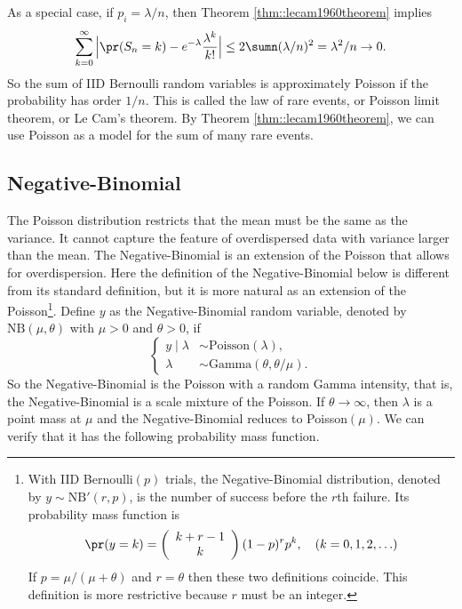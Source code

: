 As a special case, if $p_i = \lambda /  n$, then Theorem \ref{thm::lecam1960theorem} implies 
$$
\sum_{k=0}^{\infty}  \Big |   \pr(S_n = k) - e^{-\lambda} \frac{ \lambda^k }{ k!}  \Big | \leq 2\sumn (\lambda /  n)^2 = \lambda^2/n \rightarrow 0.
$$
So the sum of IID Bernoulli random variables is approximately Poisson if the probability has order $1/n.$ This is called the law of rare events, or Poisson limit theorem, or Le Cam's theorem. By Theorem \ref{thm::lecam1960theorem}, we can use Poisson as a model for the sum of many rare events. 



\subsection{Negative-Binomial}

The Poisson distribution restricts that the mean must be the same
as the variance. It cannot capture the feature of overdispersed data
with variance larger than the mean. The Negative-Binomial is an extension
of the Poisson that allows for overdispersion. Here the definition of the Negative-Binomial below is different from its standard definition, but it is more natural as an extension of the Poisson\footnote{With IID Bernoulli$(p)$ trials, the Negative-Binomial distribution,
denoted by $y\sim\text{NB}'(r,p)$, is the number of success before
the $r$th failure. 
Its probability mass function is
\[
\pr(y=k)=\left(\begin{array}{c}
k+r-1\\
k
\end{array}\right)(1-p)^{r}p^{k},\quad(k=0,1,2,\ldots)
\]
If $p=\mu/(\mu+\theta)$ and $r=\theta$ then these two definitions
coincide. 
This definition is more restrictive because $r$ must
be an integer. }. Define $y$ as the Negative-Binomial random
variable, denoted by $\text{NB}(\mu,\theta)$ with $\mu>0$ and $\theta>0$,
if 
\begin{equation}
\begin{cases}
y\mid\lambda & \sim\text{Poisson}(\lambda),\\
\lambda & \sim\text{Gamma}(\theta,\theta/\mu).
\end{cases}\label{eq:definition-nb-rv}
\end{equation}
So the Negative-Binomial is the Poisson with a random Gamma intensity, that is, the Negative-Binomial is a scale mixture of the Poisson. If $\theta\rightarrow\infty$, then $\lambda$ is a point mass at $\mu$ and the Negative-Binomial reduces to Poisson$(\mu)$. We can verify that it has the following probability mass function. 


